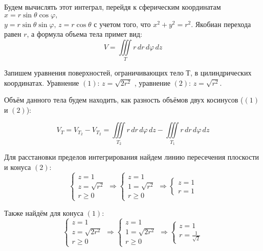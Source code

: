 \documentclass[12pt]{article}
\begin{document}
\begin{enumerate}[wide, labelwidth=!, labelindent=0pt]
		Будем вычислять этот интеграл, перейдя к сферическим координатам $x = r \sin{\theta} \cos{\varphi},$\\$y=r \sin{\theta} \sin{\varphi}, \, z= r \cos{\theta}$ с учетом того, что $x^2+y^2=r^2$. Якобиан перехода равен $r$, а формула объема тела примет вид:
		$$ V=\iiint \limits_{T} r \,d r \,d \varphi \,d z$$
		
		Запишем уравнения поверхностей, ограничивающих тело $Т$, в цилиндрических координатах. Уравнение $ (1) $: $z=\sqrt{2r^2} $ , уравнение $ (2) $: $z=\sqrt{r^2} $.

		Объём данного тела будем находить, как разность объёмов двух косинусов ($ (1) $ и $ (2) $):

		$$ V_T = V_{T_2} - V_{T_2} = \iiint \limits_{T_2} r \,d r \,d \varphi \,d z - \iiint \limits_{T_1} r \,d r \,d \varphi \,d z$$
		
		Для расстановки пределов интегрирования найдем линию пересечения плоскости и конуса $ (2) $:
		\begin{equation*}	 
			\begin{cases}
				z = 1\\
				z=\sqrt{r^2}\\
				r \geq 0
			\end{cases}
			\Rightarrow
			\begin{cases}
				z = 1\\
				1=\sqrt{r^2}\\
				r \geq 0
			\end{cases}
			\Rightarrow
			\begin{cases}
				z = 1\\
				r= 1
			\end{cases}
		\end{equation*}

		Также найдём для конуса $ (1) $:
		\begin{equation*}	 
			\begin{cases}
				z = 1\\
				z=\sqrt{2r^2}\\
				r \geq 0
			\end{cases}
			\Rightarrow
			\begin{cases}
				z = 1\\
				1=\sqrt{2r^2}\\
				r \geq 0
			\end{cases}
			\Rightarrow
			\begin{cases}
				z = 1\\
				r = \frac{1}{\sqrt{2}}
			\end{cases}
		\end{equation*}


\end{enumerate}
\end{document}
